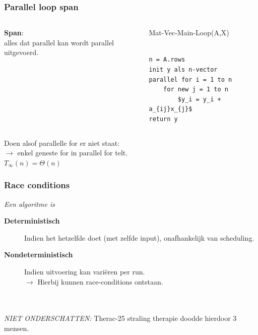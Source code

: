 \documentclass
   [kulak] %
   {kulakbeamer}
\begin{document}
\begin{frame}[fragile]
	\frametitle{Parallel loop span}
	
	
	
	\begin{columns}[T] %
		
		
			
		\begin{column}{.3\textwidth}
			\begin{minipage}[c][.6\textheight][c]{\linewidth}
				
				\textbf{Span}:\\  alles dat parallel kan
				 wordt parallel uitgevoerd.
				
			\end{minipage}
		\end{column}
		
		
		
		\begin{column}{.65\textwidth}
			
			Mat-Vec-Main-Loop(A,X)
			\begin{lstlisting}[style=CStyle]
			
n = A.rows
init y als n-vector
parallel for i = 1 to n
	for new j = 1 to n
		$y_i = y_i + a_{ij}x_{j}$
return y
			\end{lstlisting}
			
		\end{column}
		
		
		
		
		
	\end{columns}
	Doen alsof parallelle for er niet staat:\\
	$\rightarrow$ enkel geneste for in parallel for telt.\\
	$T_\infty (n) = \Theta(n)$
	
\end{frame}

\begin{frame}
	\frametitle{Race conditions}
	\textit{Een algoritme is}
	\begin{description}
		\item[\textbf{Deterministisch}]
		Indien het hetzelfde doet (met zelfde input), onafhankelijk van scheduling.
		\item[\textbf{Nondeterministisch}]
		Indien uitvoering kan variëren per run.\\
		$\rightarrow$ Hierbij kunnen race-conditions ontstaan.
	\end{description}
	\pause
	~\\~\\
	\textit{NIET ONDERSCHATTEN:}
	Therac-25 straling therapie doodde hierdoor 3 mensen.
\end{frame}
\end{document}

